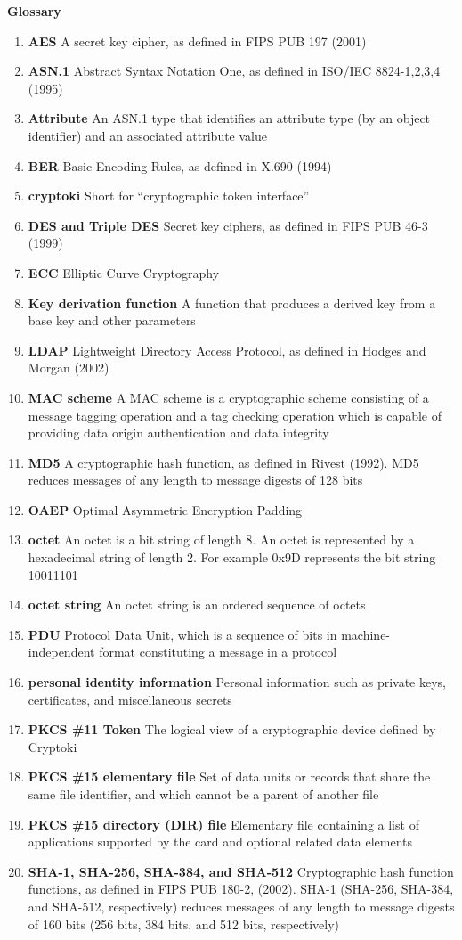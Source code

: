 \documentclass{article}
\begin{document}
\newpage
{\Large\bf Glossary}
\begin{enumerate}
\item {\bf  AES} A secret key cipher,  as defined in FIPS PUB 197 (2001)
\item {\bf ASN.1} Abstract Syntax Notation One, as defined in
ISO/IEC 8824-1,2,3,4 (1995)
\item {\bf Attribute} An ASN.1 type that identifies an attribute 
type (by an object identifier) and an associated attribute value
\item {\bf BER} Basic Encoding Rules, as defined in X.690 (1994)
\item {\bf cryptoki}  Short for ``cryptographic token interface''
\item {\bf DES and Triple DES} Secret key ciphers, as defined in 
FIPS PUB 46-3 (1999)
\item {\bf ECC} Elliptic Curve Cryptography
\item {\bf Key derivation function} A function that 
produces a derived key from a base key and other parameters
\item {\bf LDAP} Lightweight Directory Access Protocol, as defined in
Hodges and Morgan (2002)
\item {\bf MAC scheme} A MAC scheme is a cryptographic
scheme consisting of a message tagging operation and a tag checking operation
which is capable of providing data origin authentication and data integrity
\item {\bf MD5} A cryptographic hash function, as defined in Rivest (1992).
MD5 reduces messages of any length to message digests of 128 bits 
\item {\bf OAEP} Optimal Asymmetric Encryption Padding
\item {\bf octet} An octet is a bit string of length 8. 
An octet is represented
by a hexadecimal string of length 2. For example 0x9D represents
the bit string 10011101
\item {\bf octet string} An octet string is an ordered sequence of octets
\item {\bf PDU} Protocol Data Unit, which is a sequence of bits in 
machine-independent format constituting a message in a protocol
\item {\bf personal identity information} Personal information such as 
private keys, certificates, and miscellaneous secrets
\item {\bf PKCS \#11 Token} The logical view of a cryptographic device 
defined by Cryptoki
\item {\bf PKCS \#15 elementary file} 
Set of data units or records that share the same
file identifier, and which cannot be a parent of another file
\item {\bf PKCS \#15 directory (DIR) file} 
Elementary file containing a list of 
applications supported by the card and optional related data elements
\item {\bf SHA-1, SHA-256, SHA-384, and SHA-512} Cryptographic hash function 
functions, as defined in FIPS PUB 180-2, (2002). 
SHA-1 (SHA-256, SHA-384, and SHA-512, respectively)
reduces messages of any length to message digests of 160 bits 
(256 bits, 384 bits, and 512 bits, respectively)
\end{enumerate}
\end{document}

